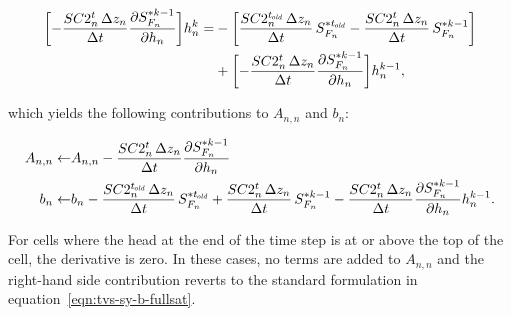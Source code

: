 \begin{equation}
	\label{eqn:tvs-sy-nr-expanded}
	\begin{aligned}
		\biggl[ - \frac{SC2_n^t \, \Delta z_n}{\Delta t} \frac{\partial S_{F_n}^{\ast k-1}}{\partial h_n} \biggr] h_n^k =
		& - \biggl[ \frac{SC2_n^{t_\mathit{\kern -0.07em old}} \, \Delta z_n}{\Delta t} \, S_{F_n}^{\ast t_\mathit{\kern -0.07em old}} - \frac{SC2_n^t \, \Delta z_n}{\Delta t} \, S_{F_n}^{\ast k-1} \biggr] \\
		& + \biggl[ - \frac{SC2_n^t \, \Delta z_n}{\Delta t} \frac{\partial S_{F_n}^{\ast k-1}}{\partial h_n} \biggr] h_n^{k-1} ,
	\end{aligned}
\end{equation}

\noindent which yields the following contributions to $A_{n,n}$ and $b_n$:

\begin{equation}
	\label{eqn:tvs-sy-Ab-std}
	\begin{aligned}
		A_{n,n} \leftarrow & A_{n,n} - \frac{SC2_n^t \, \Delta z_n}{\Delta t} \frac{\partial S_{F_n}^{\ast k-1}}{\partial h_n} \\
		b_n \leftarrow & b_n - \frac{SC2_n^{t_\mathit{\kern -0.07em old}} \, \Delta z_n}{\Delta t} \, S_{F_n}^{\ast t_\mathit{\kern -0.07em old}} + \frac{SC2_n^t \, \Delta z_n}{\Delta t} \, S_{F_n}^{\ast k-1} - \frac{SC2_n^t \, \Delta z_n}{\Delta t} \frac{\partial S_{F_n}^{\ast k-1}}{\partial h_n} h_n^{k-1} .
	\end{aligned}
\end{equation}

\noindent For cells where the head at the end of the time step is at or above the top of the cell, the derivative is zero. In these cases, no terms are added to $A_{n,n}$ and the right-hand side contribution reverts to the standard formulation in equation~\ref{eqn:tvs-sy-b-fullsat}.
